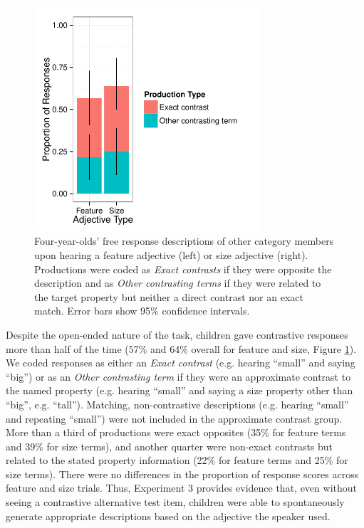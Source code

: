 \documentclass[man]{apa2}
\begin{document}
\begin{figure}[t] 
  \begin{center} 
    \includegraphics[width=3.3in]{figures/expt3.pdf} 
    \caption{\label{fig:freeResponse} Four-year-olds' free response descriptions of other category members upon hearing a feature adjective (left) or size adjective (right). Productions were coded as \emph{Exact contrasts} if they were opposite the description and as \emph{Other contrasting terms} if they were related to the target property but neither a direct contrast nor an exact match. Error bars show 95\% confidence intervals. }
  \end{center} 
\vspace{-10ex}
\end{figure}

Despite the open-ended nature of the task, children gave contrastive responses more than half of the time (57\% and 64\% overall for feature and size, Figure \ref{fig:freeResponse}).  We coded responses as either an \emph{Exact contrast} (e.g. hearing ``small'' and saying ``big'') or as an \emph{Other contrasting term} if they were an approximate contrast to the named property (e.g. hearing ``small'' and saying a size property other than ``big'', e.g. ``tall''). Matching, non-contrastive descriptions (e.g. hearing ``small'' and repeating ``small'') were not included in the approximate contrast group. More than a third of productions were exact opposites (35\% for feature terms and 39\% for size terms), and another quarter were non-exact contrasts but related to the stated property information (22\% for feature terms and 25\% for size terms). There were no differences in the proportion of response scores across feature and size trials. Thus, Experiment 3 provides evidence that, even without seeing a contrastive alternative test item, children were able to spontaneously generate appropriate descriptions based on the adjective the speaker used. 
\end{document}
